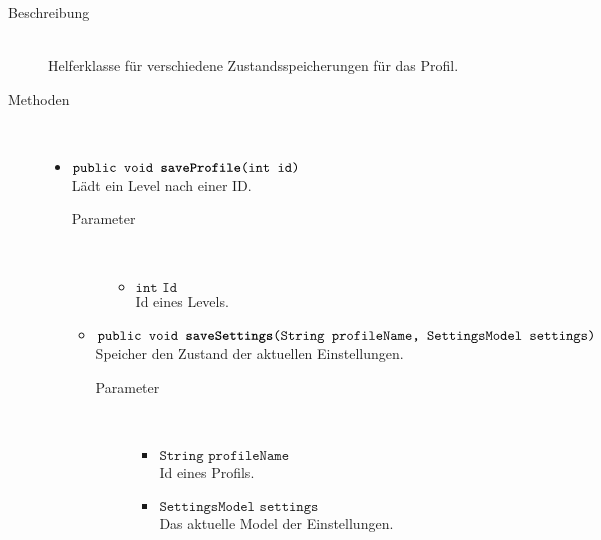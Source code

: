 \begin{description}
\item[Beschreibung] \hfill \\ Helferklasse für verschiedene Zustandsspeicherungen für das Profil.

\item[Methoden] \hfill \\
	\vspace{-.8cm}
	\begin{itemize}
		\item $\texttt{public void \textbf{saveProfile}(int id)}$ \\ Lädt ein Level nach einer ID.
		\begin{description}
			\item[Parameter] \hfill \\
			\vspace{-.8cm}
			\begin{itemize}
				\item $\texttt{int Id}$ \\ Id eines Levels.
			\end{itemize}
		\end{description}
		
		\begin{itemize}
		\item $\texttt{public void \textbf{saveSettings}(String profileName, SettingsModel settings)}$ \\ Speicher den Zustand der aktuellen Einstellungen.
				\begin{description}
			\item[Parameter] \hfill \\
			\vspace{-.8cm}
			\begin{itemize}
				\item $\texttt{String profileName}$ \\ Id eines Profils.
								\item $\texttt{SettingsModel settings}$ \\ Das aktuelle Model der Einstellungen.
			\end{itemize}
		\end{description}
		

\end{itemize}
\end{itemize}
\end{description}
